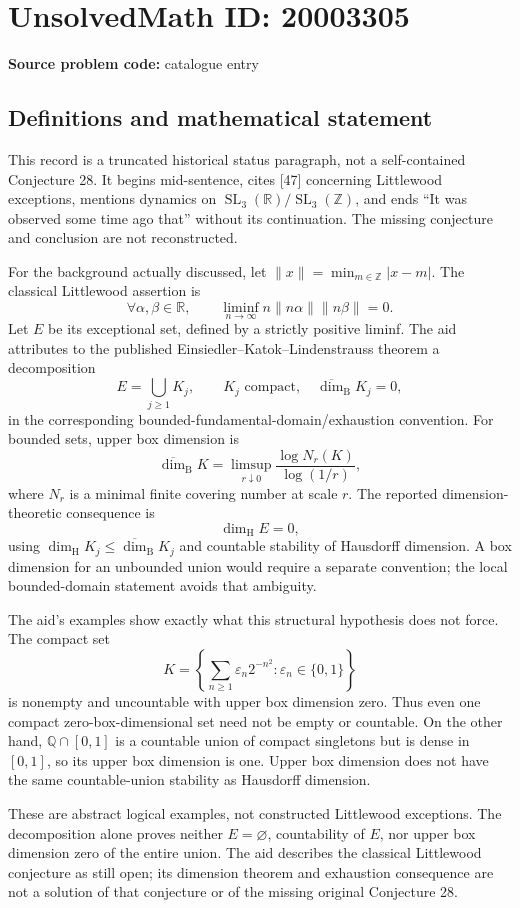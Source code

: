 \documentclass[11pt]{article}
\newcommand{\Z}{\mathbb{Z}}
\newcommand{\Q}{\mathbb{Q}}
\newcommand{\R}{\mathbb{R}}
\begin{document}
\section*{UnsolvedMath ID: 20003305}
\textbf{Source problem code:} catalogue entry
\subsection{Definitions and mathematical statement}
This record is a truncated historical status paragraph, not a self-contained Conjecture 28. It begins mid-sentence, cites [47] concerning Littlewood exceptions, mentions dynamics on \(\operatorname{SL}_3(\R)/\operatorname{SL}_3(\Z)\), and ends ``It was observed some time ago that'' without its continuation. The missing conjecture and conclusion are not reconstructed.

For the background actually discussed, let \(\|x\|=\min_{m\in\Z}|x-m|\). The classical Littlewood assertion is
\[
 \forall\alpha,\beta\in\R,\qquad
 \liminf_{n\to\infty}n\|n\alpha\|\|n\beta\|=0.
\]
Let \(E\) be its exceptional set, defined by a strictly positive liminf. The aid attributes to the published Einsiedler--Katok--Lindenstrauss theorem a decomposition
\[
 E=\bigcup_{j\geq1}K_j,
 \qquad K_j\text{ compact},\quad\overline{\dim}_{\mathrm B}K_j=0,
\]
in the corresponding bounded-fundamental-domain/exhaustion convention. For bounded sets, upper box dimension is
\[
 \overline{\dim}_{\mathrm B}K
 =\limsup_{r\downarrow0}\frac{\log N_r(K)}{\log(1/r)},
\]
where \(N_r\) is a minimal finite covering number at scale \(r\). The reported dimension-theoretic consequence is
\[
 \dim_{\mathrm H}E=0,
\]
using \(\dim_{\mathrm H}K_j\leq\overline{\dim}_{\mathrm B}K_j\) and countable stability of Hausdorff dimension. A box dimension for an unbounded union would require a separate convention; the local bounded-domain statement avoids that ambiguity.

The aid's examples show exactly what this structural hypothesis does not force. The compact set
\[
 K=\left\{\sum_{n\geq1}\varepsilon_n2^{-n^2}:\varepsilon_n\in\{0,1\}\right\}
\]
is nonempty and uncountable with upper box dimension zero. Thus even one compact zero-box-dimensional set need not be empty or countable. On the other hand, \(\Q\cap[0,1]\) is a countable union of compact singletons but is dense in \([0,1]\), so its upper box dimension is one. Upper box dimension does not have the same countable-union stability as Hausdorff dimension.

These are abstract logical examples, not constructed Littlewood exceptions. The decomposition alone proves neither \(E=\varnothing\), countability of \(E\), nor upper box dimension zero of the entire union. The aid describes the classical Littlewood conjecture as still open; its dimension theorem and exhaustion consequence are not a solution of that conjecture or of the missing original Conjecture 28.
\end{document}
